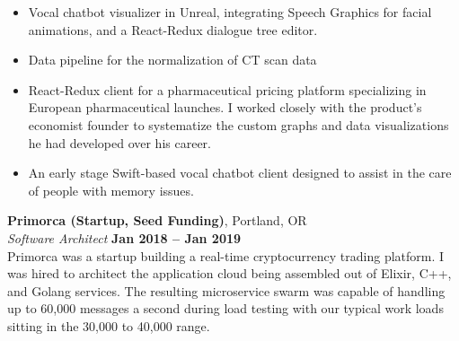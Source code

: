 \documentclass[margin,line]{resume}
\begin{document}
\begin{resume}
\begin{itemize}
\item Vocal chatbot visualizer in Unreal, integrating Speech Graphics for facial animations, and a React-Redux dialogue tree editor.
\item Data pipeline for the normalization of CT scan data
\item React-Redux client for a pharmaceutical pricing platform specializing in European pharmaceutical launches. I worked closely with the product's economist founder to systematize the custom graphs and data visualizations he had developed over his career.
\item An early stage Swift-based vocal chatbot client designed to assist in the care of people with memory issues.
\end{itemize}

    \textbf{Primorca (Startup, Seed Funding)}, Portland, OR \vspace{2mm}\\\vspace{1mm}%
    \textsl{Software Architect} \hfill \textbf{Jan 2018 -- Jan 2019}\\
  Primorca was a startup building a real-time cryptocurrency trading platform. I was hired to architect the application cloud being assembled out of Elixir, C++, and Golang services.
The resulting microservice swarm was capable of handling up to 60,000 messages a second during load testing with our typical work loads sitting in the 30,000 to 40,000 range. 


\end{resume}
\end{document}
